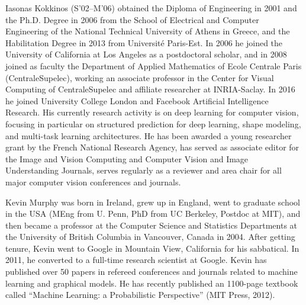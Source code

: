 \begin{IEEEbiography}{Iasonas Kokkinos}
(S'02--M'06) obtained the Diploma of Engineering in 2001 and the Ph.D. Degree in 2006 from the School of Electrical and Computer Engineering of the National Technical University of Athens in Greece, and the Habilitation Degree in 2013 from Université Paris-Est. In 2006 he joined the University of California at Los Angeles as a postdoctoral scholar, and in 2008 joined as faculty the Department of Applied Mathematics of Ecole Centrale Paris (CentraleSupelec), working an associate professor in the Center for Visual Computing of CentraleSupelec and affiliate researcher at INRIA-Saclay. In 2016 he joined University College London and Facebook Artificial Intelligence Research. His currently research activity is on deep learning for computer vision, focusing in particular on structured prediction for deep learning, shape modeling, and multi-task learning architectures. He has been awarded a young researcher grant by the French National Research Agency, has served as associate editor for the Image and Vision Computing and Computer Vision and Image Understanding Journals, serves regularly as a reviewer and area chair for all major computer vision conferences and journals.
\end{IEEEbiography}

\begin{IEEEbiography}{Kevin Murphy}
was born in Ireland, grew
up  in  England,  went  to  graduate  school  in  the
USA (MEng from U. Penn, PhD from UC Berkeley,
Postdoc at MIT), and then became a professor at
the Computer Science and Statistics Departments at
the University of British Columbia in
Vancouver, Canada in 2004. After getting tenure,
Kevin  went  to  Google  in  Mountain  View,  California
for his sabbatical. In 2011, he converted
to a full-time research scientist at Google. Kevin
has published over 50 papers in refereed conferences
and journals related to machine learning and graphical models.
He  has  recently  published  an  1100-page  textbook  called
``Machine Learning: a Probabilistic Perspective''
(MIT Press, 2012).
\end{IEEEbiography}

